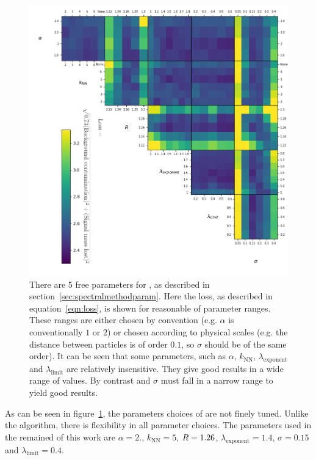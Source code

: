     \begin{figure}[htp]
            \includegraphics[width=1\textwidth]{graphics/trangle_scan_incomplete.png}
            \caption{There are 5 free parameters for \spectral{},
                as described in section~\ref{sec:spectralmethodparam}.
                Here the loss, as described in equation~\ref{eqn:loss}, is shown for reasonable of parameter ranges.
                These ranges are either chosen by convention (e.g. \(\alpha\) is conventionally \(1\) or \(2\))
                or chosen according to physical scales (e.g. the distance between particles is of order \(0.1\),
                so \(\sigma\) should be of the same order).
                It can be seen that some parameters, such as \(\alpha\), \(k_\text{NN}\), \(\lambda_\text{exponent}\)
                and \(\lambda_\text{limit}\) are relatively insensitive.
                They give good results in a wide range of values.
                By contrast \stoppingdeltar{} and \(\sigma\) must fall in a narrow range to yield good results.
             }\label{fig:scan_spectral}
    \end{figure}    

    As can be seen in figure~\ref{fig:scan_spectral}, the parameters choices of \spectral{} are not finely tuned.
    Unlike the \antikt{} algorithm, there is flexibility in all parameter choices.
    The parameters used in the remained of this work are \(\alpha=2.\), \(k_\text{NN}=5\), \(R{} = 1.26\), \(\lambda_\text{exponent} = 1.4\), \(\sigma = 0.15\) and \(\lambda_\text{limit} = 0.4\).
